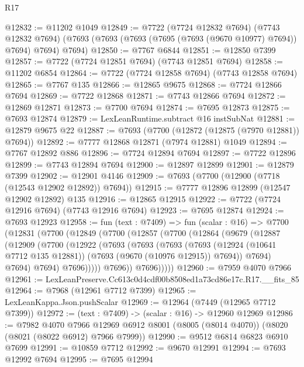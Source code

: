 \begin{lexlean}{R17}
\begin{coremodule}
@12832 := @11202 @1049
@12849 := @7722
    (@7724 @12832 @7694)
    (@7743 @12832 @7694)
    (@7693 (@7693 (@7693 (@7695 (@7693 (@9670 @10977) @7694)) @7694) @7694) @7694)
@12850 := @7767 @6844
@12851 := @12850 @7399
@12857 := @7722 (@7724 @12851 @7694) (@7743 @12851 @7694)
@12858 := @11202 @6854
@12864 := @7722 (@7724 @12858 @7694) (@7743 @12858 @7694)
@12865 := @7767 @135
@12866 := @12865 @9675
@12868 := @7724 @12866 @7694
@12869 := @7722 @12868
@12871 := @7743 @12866 @7694
@12872 := @12869 @12871
@12873 := @7700 @7694
@12874 := @7695 @12873
@12875 := @7693 @12874
@12879 := LexLeanRuntime.subtract @16 instSubNat
@12881 := @12879 @9675 @22
@12887 := @7693 (@7700 (@12872 (@12875 (@7970 @12881)) @7694))
@12892 := @7777 @12868 @12871 (@7974 @12881) @1049
@12894 := @7767 @12892 @886
@12896 := @7724 @12894 @7694
@12897 := @7722 @12896
@12899 := @7743 @12894 @7694
@12900 := @12897 @12899
@12901 := @12879 @7399
@12902 := @12901 @4146
@12909 := @7693 (@7700 (@12900 (@7718 (@12543 @12902 @12892)) @7694))
@12915 := @7777 @12896 @12899 (@12547 @12902 @12892) @135
@12916 := @12865 @12915
@12922 := @7722 (@7724 @12916 @7694) (@7743 @12916 @7694)
@12923 := @7695 @12874
@12924 := @7693 @12923
@12958 := fun (text : @7409) =>
  fun (scalar : @16) =>
  @7700
    (@12831
      (@7700
        (@12849
          (@7700
            (@12857
              (@7700
                (@12864
                  (@9679
                    (@12887
                      (@12909
                        (@7700
                          (@12922
                            (@7693
                              (@7693
                                (@7693
                                  (@7693
                                    (@12924 (@10641 @7712 @135 @12881))
                                    (@7693 (@9670 (@10976 @12915)) @7694))
                                  @7694)
                                @7694)
                              @7694)
                            @7696)))))
                  @7696))
              @7696)))))
@12960 := @7959 @4070 @7966
@12961 := LexLeanPreserve.Cc613c0d4cdf00b8508ed1a73cd86e17c.R17.__fits_85
@12964 := @7968 (@12961 @7712 @7399)
@12965 := LexLeanKappa.Json.pushScalar
@12969 := @12964 (@7449 (@12965 @7712 @7399))
@12972 := (text : @7409) -> (scalar : @16) -> @12960 @12969
@12986 := @7982
    @4070
    @7966
    @12969
    @6912
    @8001
    (@8005 (@8014 @4070))
    (@8020 (@8021 (@8022 @6912) @7966 @7999))
@12990 := @9512 @6814 @6823 @6910 @7699
@12991 := @10859 @7712
@12992 := @9670 @12991
@12994 := @7693 @12992 @7694
@12995 := @7695 @12994

\end{coremodule}
\end{lexlean}

